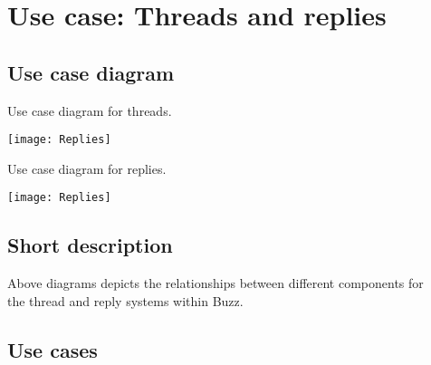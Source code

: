 

\section{Use case: Threads and replies}
	\subsection{Use case diagram}
	\begin{description}
		\item[Use case diagram for threads.] 
	\end{description}
	\texttt{[image: Replies]}
		\begin{description}
			\item[Use case diagram for replies.] 
		\end{description}
\texttt{[image: Replies]}
	
	\subsection{Short description}
	\begin{description}
		\item[Above diagrams depicts the relationships between different components for ]
		 \item[the thread and reply systems within Buzz.] 
	\end{description}
	\subsection{Use cases}



